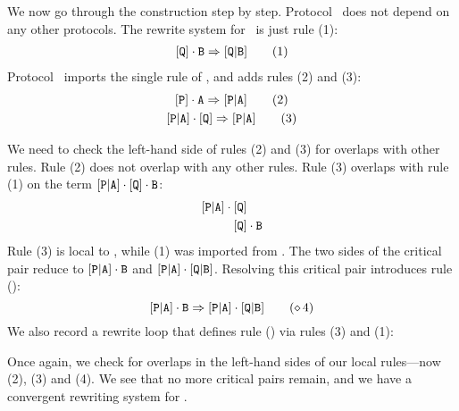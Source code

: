 \documentclass[../generics]{subfiles}
\begin{document}
\begin{example}
We now go through the construction step by step. Protocol \tQ\ does not depend on any other protocols. The rewrite system for \tQ\ is just rule (1):
\begin{gather*}
[\texttt{Q}]\cdot\texttt{B}\Rightarrow[\texttt{Q}|\texttt{B}]\tag{1}
\end{gather*}
Protocol \tP\ imports the single rule of \tQ, and adds rules (2) and (3):
\begin{gather*}
\AssocIntro{P}{A}\tag{2}\\
\ProtoConf{\aPA}{Q}\tag{3}
\end{gather*}

We need to check the left-hand side of rules (2) and (3) for overlaps with other rules. Rule (2) does not overlap with any other rules. Rule (3) overlaps with rule (1) on the term $[\texttt{P}|\texttt{A}]\cdot[\texttt{Q}]\cdot\texttt{B}$:
\begin{align*}
[\texttt{P}|\texttt{A}]\cdot{}&[\texttt{Q}]\\
&[\texttt{Q}]\cdot\texttt{B}
\end{align*}
Rule (3) is local to \tP, while (1) was imported from \tQ. The two sides of the critical pair reduce to $[\texttt{P}|\texttt{A}]\cdot\texttt{B}$ and $[\texttt{P}|\texttt{A}]\cdot[\texttt{Q}|\texttt{B}]$. Resolving this critical pair introduces rule ():
\[
\aPA\cdot\nB\Rightarrow\aPA\cdot\assocsym{Q}{B}\tag{\CRule{4}}
\]
We also record a rewrite loop that defines rule () via rules (3) and (1):
\begin{center}
\end{center}
Once again, we check for overlaps in the left-hand sides of our local rules---now (2), (3) and (4). We see that no more critical pairs remain, and we have a convergent rewriting system for \tP.


\end{example}
\end{document}
